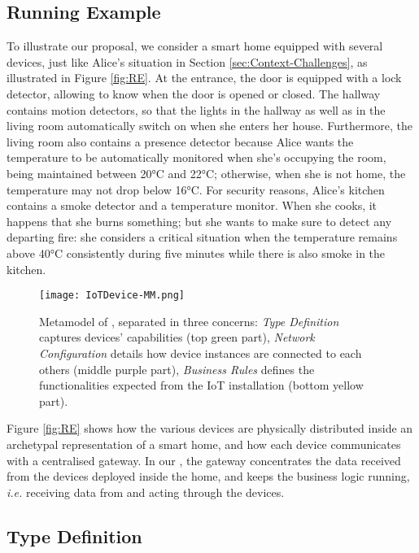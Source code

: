 \subsection{Running Example}
\label{sec:IoTDSL-Example}

To illustrate our proposal, we consider a smart home equipped with several devices, just like Alice's situation in Section \ref{sec:Context-Challenges}, as illustrated in Figure \ref{fig:RE}. At the entrance, the door is equipped with a lock detector, allowing to know when the door is opened or closed. The hallway contains motion detectors, so that the lights in the hallway as well as in the living room automatically switch on when she enters her house. Furthermore, the living room also contains a presence detector because Alice wants the temperature to be automatically monitored when she's occupying the room, being maintained between 20°C and 22°C; otherwise, when she is not home, the temperature may not drop below 16°C. For security reasons, Alice's kitchen contains a smoke detector and a temperature monitor. When she cooks, it happens that she burns something; but she wants to make sure to detect any departing fire: she considers a critical situation when the temperature remains above 40°C consistently during five minutes while there is also smoke in the kitchen. 

\begin{figure*}%
  \centering  
  \texttt{[image: IoTDevice-MM.png]}%
  \caption{Metamodel of \IOTDSL, separated in three concerns: \emph{Type Definition} captures devices' capabilities (top green part), \emph{Network Configuration} details how device instances are connected to each others (middle purple part), \emph{Business Rules} defines the functionalities expected from the IoT installation (bottom yellow part).}%
  \label{fig:IoTDevice-MM}%
\end{figure*}

Figure \ref{fig:RE} shows how the various devices are physically distributed inside an archetypal representation of a smart home, and how each device communicates with a centralised gateway. In our \DSL, the gateway concentrates the data received from the devices deployed inside the home, and keeps the business logic running, \textit{i.e.} receiving data from and acting through the devices. 

\subsection{Type Definition}
\label{sec:IoTDSL-Type}
 
